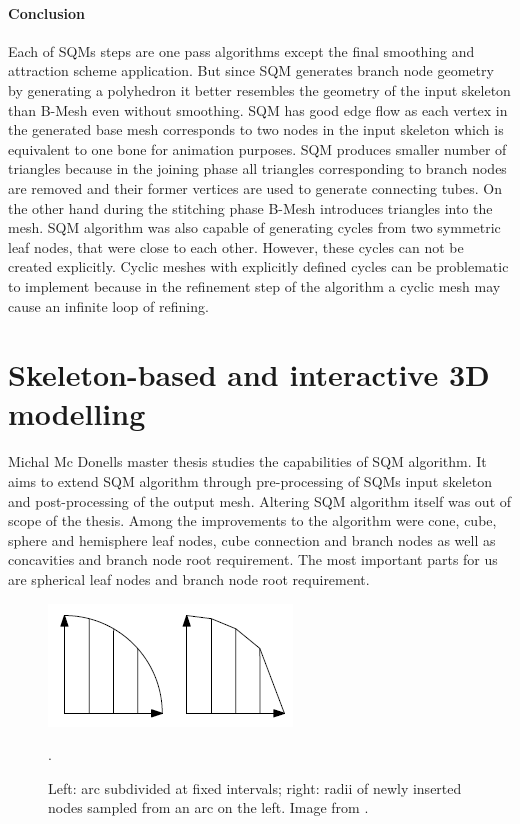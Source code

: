 \paragraph{Conclusion}
Each of SQMs steps are one pass algorithms except the final smoothing and attraction scheme application. But since SQM generates branch node geometry by generating a polyhedron it better resembles the geometry of the input skeleton than B-Mesh even without smoothing.
SQM has good edge flow as each vertex in the generated base mesh corresponds to two nodes in the input skeleton which is equivalent to one bone for animation purposes.
SQM produces smaller number of triangles because in the joining phase all triangles corresponding to branch nodes are removed and their former vertices are used to generate connecting tubes. On the other hand during the stitching phase B-Mesh introduces triangles into the mesh.
SQM algorithm was also capable of generating cycles from two symmetric leaf nodes, that were close to each other.
However, these cycles can not be created explicitly.
Cyclic meshes with explicitly defined cycles can be problematic to implement because in the refinement step of the algorithm a cyclic mesh may cause an infinite loop of refining.

\section{Skeleton-based and interactive 3D modelling} 
Michal Mc Donells master thesis studies the capabilities of SQM algorithm. It aims to extend SQM algorithm through pre-processing of SQMs input skeleton and post-processing of the output mesh. Altering SQM algorithm itself was out of scope of the thesis. Among the improvements to the algorithm were cone, cube, sphere and hemisphere leaf nodes, cube connection and branch nodes as well as concavities and branch node root requirement. The most important parts for us are spherical leaf nodes and branch node root requirement.

\begin{figure}[h]
    \centering
    \includegraphics[]{images/spherical_node.png}
    \caption[Spherical nodes radii]{Left: arc subdivided at fixed intervals; right: radii of newly inserted nodes sampled from an arc on the left. Image from \cite{sqm_phd}.}.
    \label{fig:esqm_spherical}
\end{figure}

